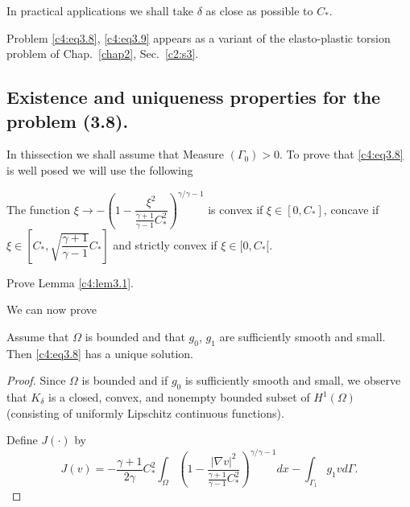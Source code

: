 \begin{remark}\label{c4:rem3.2}%
In practical applications we shall take $\delta$ as close as possible to $C_*$. 
\end{remark}

\begin{remark}\label{c4:rem3.3}%
Problem \eqref{c4:eq3.8}, \eqref{c4:eq3.9} appears as a variant of the elasto-plastic 
torsion problem of Chap.~\ref{chap2}, Sec.~\ref{c2:s3}.
\end{remark}

\subsection{Existence and uniqueness properties for the problem
  (3.8).}\label{c4:ss3.3}  

In this\pageoriginale  section we shall assume that Measure
$(\Gamma_0) >0$. To prove that \eqref{c4:eq3.8} is well posed we will
use the following 

\begin{lemma}\label{c4:lem3.1}%
The function $\xi \to -\left(1-
\dfrac{\xi^2}{\frac{\gamma+1}{\gamma-1}C^2_*}\right)^{\gamma/ \gamma-1}$
is convex if $\xi \in[0, C_*]$, concave if $\xi \in [C_*,
  \sqrt{\dfrac{\gamma+1}{\gamma-1}}C_*]$ and strictly convex if $\xi
\in [ 0, C_* [ $. 
\end{lemma}

\begin{exercise}\label{c4:exer3.1}%
Prove Lemma \ref{c4:lem3.1}.

We can now prove 
\end{exercise}

\begin{theorem}\label{c4:thm3.1}%
Assume that $\Omega$ is bounded and that $g_0$, $g_1$ are sufficiently
smooth and small. Then \eqref{c4:eq3.8} has a unique solution. 
\end{theorem}

\begin{proof}%
Since $\Omega$ is bounded and if $g_0$ is sufficiently smooth and
small, we observe that $K_\delta$ is a closed, convex, and nonempty
bounded subset of $H^1(\Omega)$ (consisting of uniformly Lipschitz
continuous functions). 

Define $J(\cdot)$ by 
\begin{equation}
J(v) = - \frac{\gamma+ 1}{2 \gamma} C^2_* \int_\Omega \left(1- \frac{|
  \nabla v|^2}{\frac{\gamma + 1}{\gamma - 1}C^2_*}\right)^{\gamma /\gamma -
  1}dx - \int_{\Gamma_1} g_1 v d \Gamma. \tag{3.10}\label{c4:eq3.10} 
\end{equation}
\end{proof}

